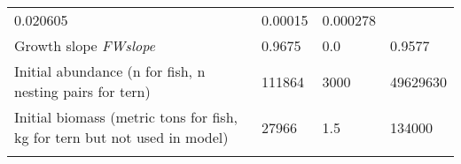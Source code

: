 \documentclass[]{article}
\begin{document}
\begin{longtable}[]{@{}llll@{}}
\begin{minipage}[t]{0.11\columnwidth}
0.020605\strut
\end{minipage} & \begin{minipage}[t]{0.11\columnwidth}\raggedright\strut
0.00015\strut
\end{minipage} & \begin{minipage}[t]{0.11\columnwidth}\raggedright\strut
0.000278\strut
\end{minipage}\tabularnewline
\begin{minipage}[t]{0.56\columnwidth}\raggedright\strut
Growth slope \emph{FWslope }\strut
\end{minipage} & \begin{minipage}[t]{0.11\columnwidth}\raggedright\strut
0.9675\strut
\end{minipage} & \begin{minipage}[t]{0.11\columnwidth}\raggedright\strut
0.0\strut
\end{minipage} & \begin{minipage}[t]{0.11\columnwidth}\raggedright\strut
0.9577\strut
\end{minipage}\tabularnewline
\begin{minipage}[t]{0.56\columnwidth}\raggedright\strut
Initial abundance (n for fish, n nesting pairs for tern)\strut
\end{minipage} & \begin{minipage}[t]{0.11\columnwidth}\raggedright\strut
111864\strut
\end{minipage} & \begin{minipage}[t]{0.11\columnwidth}\raggedright\strut
3000\strut
\end{minipage} & \begin{minipage}[t]{0.11\columnwidth}\raggedright\strut
49629630\strut
\end{minipage}\tabularnewline
\begin{minipage}[t]{0.56\columnwidth}\raggedright\strut
Initial biomass (metric tons for fish, kg for tern but not used in
model)\strut
\end{minipage} & \begin{minipage}[t]{0.11\columnwidth}\raggedright\strut
27966\strut
\end{minipage} & \begin{minipage}[t]{0.11\columnwidth}\raggedright\strut
1.5\strut
\end{minipage} & \begin{minipage}[t]{0.11\columnwidth}\raggedright\strut
134000\strut
\end{minipage}\tabularnewline
\begin{minipage}[t]{0.56\columnwidth}\raggedright\strut

\end{minipage}
\end{longtable}
\end{document}
